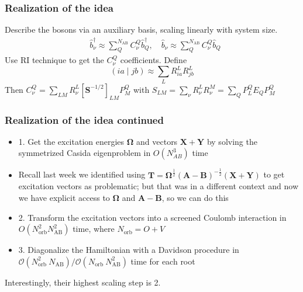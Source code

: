 \begin{frame}
    \frametitle{Realization of the idea}
Describe the bosons via an auxiliary basis, scaling linearly with system size.
\begin{equation}
\begin{aligned}
& \hat{b}_\nu^{\dagger} \approx \sum_Q^{N_{\mathrm{AB}}} C_\nu^Q \hat{b}_Q^{\dagger}, \quad \hat{b}_\nu \approx \sum_Q^{N_{\mathrm{AB}}} C_\nu^Q \hat{b}_Q
\end{aligned}
\end{equation}
Use RI technique to get the $C_\nu^Q$ coefficients. Define 
\begin{equation}
(i a \mid j b) \approx \sum_L R_{i a}^L R_{j b}^L
\end{equation}
Then 
$C_\nu^Q=\sum_{L M} R_\nu^L\left[\mathbf{S}^{-1 / 2}\right]_{L M} P_M^Q$ with $S_{L M}=\sum_\nu R_\nu^L R_\nu^M=\sum_Q P_L^Q E_Q P_M^Q$

\end{frame}

\begin{frame}
    \frametitle{Realization of the idea continued}
\begin{itemize}
    \item 1. Get the excitation energies $\bm{\Omega}$ and vectors $\bm{X}+\bm{Y}$ by solving the symmetrized Casida eigenproblem in $O(N_{AB}^3)$ time 
    \item Recall last week we identified using $\textbf{T} = \boldsymbol{\Omega }^{\frac{1}{2}} \left(\textbf{A}-\textbf{B}\right)^{-\frac{1}{2}}\left(\textbf{X} + \textbf{Y}\right)$ to get excitation vectors as problematic; but that was in a different context and now we have explicit access to $\bm{\Omega }$ and $\bm{A}-\bm{B}$, so we can do this
    \item 2. Transform the excitation vectors into a screened Coulomb interaction in $O(N_{\text{orb}}^2 N_{\text{AB}}^2)$ time, where $N_{\text{orb}}=O+V$
    \item 3. Diagonalize the Hamiltonian with a Davidson procedure in $\mathcal{O}\left(N_{\text {orb }}^2 N_{\mathrm{AB}}\right) / \mathcal{O}\left(N_{\text {orb }} N_{\mathrm{AB}}^2\right)$ time for each root
\end{itemize}
Interestingly, their highest scaling step is 2. 
\end{frame}
